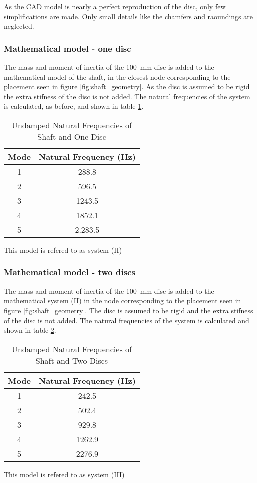 As the CAD model is nearly a perfect reproduction of the disc, only few simplifications are made. Only small details like the chamfers and raoundings are neglected.

\subsubsection{Mathematical model - one disc}
The mass and moment of inertia of the \SI{100}{\milli \meter} disc is added to the mathematical model of the shaft, in the closest node corresponding to the placement seen in figure \ref{fig:shaft_geometry}.
As the disc is assumed to be rigid the extra stifness of the disc is not added. The natural frequencies of the system is calculated, as before, and shown in table \ref{tab:natural_freq_one_disc}.
\begin{table}[htbp]
    \centering
    \caption{Undamped Natural Frequencies of Shaft and One Disc}
    \label{tab:natural_freq_one_disc}
    \begin{tabular}{@{}cc@{}}
        \toprule
        Mode    &   Natural Frequency (\si{\hertz})    \\ \midrule
        1       &   288.8   \\
        2       &   596.5   \\
        3       &   1243.5  \\
        4       &   1852.1  \\ 
        5       &   2.283.5 \\ \bottomrule
    \end{tabular}
\end{table}
This model is refered to as system (II)

\subsubsection{Mathematical model - two discs}
The mass and moment of inertia of the \SI{100}{\milli \meter} disc is added to the mathematical system (II) in the node corresponding to the placement seen in figure \ref{fig:shaft_geometry}.
The disc is assumed to be rigid and the extra stifness of the disc is not added. The natural frequencies of the system is calculated and shown in table \ref{tab:natural_freq_two_discs}.
\begin{table}[htbp]
    \centering
    \caption{Undamped Natural Frequencies of Shaft and Two Discs}
    \label{tab:natural_freq_two_discs}
    \begin{tabular}{@{}cc@{}}
        \toprule
        Mode    &   Natural Frequency (\si{\hertz})    \\ \midrule
        1       &   242.5   \\
        2       &   502.4   \\
        3       &   929.8  \\
        4       &   1262.9  \\ 
        5       &   2276.9 \\ \bottomrule
    \end{tabular}
\end{table}
This model is refered to as system (III)


